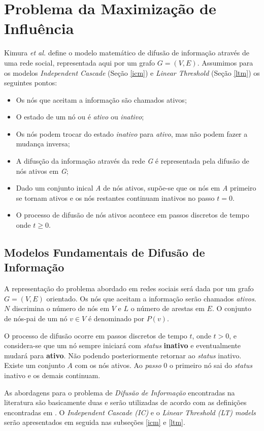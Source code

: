 \documentclass{acm_proc_article-sp}
\begin{document}
\section{Problema da Maximização de Influência}
Kimura \textit{et al.}\cite{kimura:2010} define o modelo matemático de difusão de informação através de uma rede 
social, representada aqui por um grafo $G = (V, E)$. Assumimos para os modelos \textit{Independent Cascade}
(Seção \ref{icm}) e \textit{Linear Threshold} (Seção \ref{ltm}) os seguintes pontos:
\begin{itemize}
  \item Os nós que aceitam a informação são chamados ativos;
  \item O estado de um nó ou é \textit{ativo} ou \textit{inativo};
  \item Os nós podem trocar do estado \textit{inativo} para \textit{ativo}, mas não podem fazer a mudança inversa;
  \item A difusção da informação através da rede \textit{G} é representada pela difusão de nós ativos em
  \textit{G};
  \item Dado um conjunto inical \textit{A} de nós ativos, supõe-se que os nós em \textit{A} primeiro se tornam
  ativos e os nós restantes continuam inativos no passo $t = 0$.
  \item O processo de difusão de nós ativos acontece em passos discretos de tempo onde $t \geq 0$.
\end{itemize}

\subsection{Modelos Fundamentais de Difusão de Informação}
A representação do problema abordado em redes sociais será dada por um grafo $G = (V,E)$ orientado. Os nós que aceitam a informação 
serão chamados \textit{ativos}. $N$ discrimina o número de nós em $V$ e $L$ o número de arestas em $E$. O conjunto de
nós-pai de um nó $v \in V$ é denominado por $P(v)$.

O processo de difusão ocorre em passos discretos de tempo $t$, onde $t > 0$, e considera-se que um nó sempre iniciará com \textit{status}
\textbf{inativo} e eventualmente mudará para \textbf{ativo}. Não podendo posteriormente retornar ao \textit{status} inativo. Existe um 
conjunto $A$ com os nós ativos. Ao \textit{passo} $0$ o primeiro nó sai do \textit{status} inativo e os demais continuam.

As abordagens para o problema de \textit{Difusão de Informação} encontradas na literatura são basicamente duas e serão utilizadas de
acordo com as definições encontradas em \cite{kempe:2003}. O \textit{Independent Cascade (IC)} e o \textit{Linear Threshold (LT) models} 
serão apresentados em seguida nas subseções \ref{icm} e \ref{ltm}.
\end{document}
